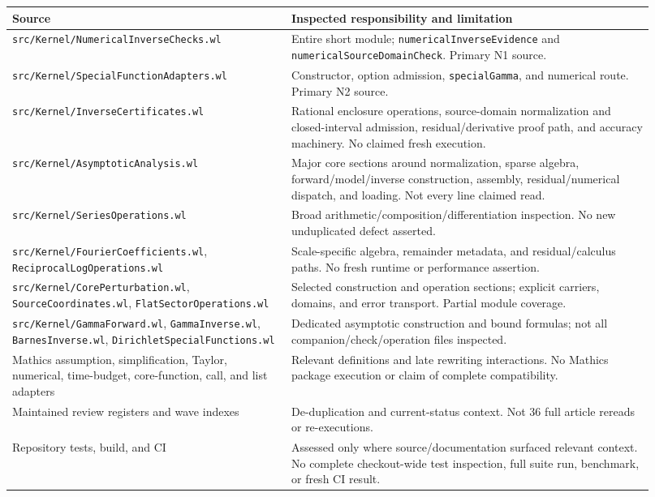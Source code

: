 \documentclass[11pt,letterpaper]{article}
\newcommand{\code}[1]{{\small\nolinkurl{#1}}}
\begin{document}
\begin{longtable}{@{}P{0.40\linewidth}P{0.52\linewidth}@{}}
\toprule
Source & Inspected responsibility and limitation\\\midrule\endhead
\code{src/Kernel/NumericalInverseChecks.wl} & Entire short module; \code{numericalInverseEvidence} and \code{numericalSourceDomainCheck}. Primary N1 source.\\[4pt]
\code{src/Kernel/SpecialFunctionAdapters.wl} & Constructor, option admission, \code{specialGamma}, and numerical route. Primary N2 source.\\[4pt]
\code{src/Kernel/InverseCertificates.wl} & Rational enclosure operations, source-domain normalization and closed-interval admission, residual/derivative proof path, and accuracy machinery. No claimed fresh execution.\\[4pt]
\code{src/Kernel/AsymptoticAnalysis.wl} & Major core sections around normalization, sparse algebra, forward/model/inverse construction, assembly, residual/numerical dispatch, and loading. Not every line claimed read.\\[4pt]
\code{src/Kernel/SeriesOperations.wl} & Broad arithmetic/composition/differentiation inspection. No new unduplicated defect asserted.\\[4pt]
\code{src/Kernel/FourierCoefficients.wl}, \code{ReciprocalLogOperations.wl} & Scale-specific algebra, remainder metadata, and residual/calculus paths. No fresh runtime or performance assertion.\\[4pt]
\code{src/Kernel/CorePerturbation.wl}, \code{SourceCoordinates.wl}, \code{FlatSectorOperations.wl} & Selected construction and operation sections; explicit carriers, domains, and error transport. Partial module coverage.\\[4pt]
\code{src/Kernel/GammaForward.wl}, \code{GammaInverse.wl}, \code{BarnesInverse.wl}, \code{DirichletSpecialFunctions.wl} & Dedicated asymptotic construction and bound formulas; not all companion/check/operation files inspected.\\[4pt]
Mathics assumption, simplification, Taylor, numerical, time-budget, core-function, call, and list adapters & Relevant definitions and late rewriting interactions. No Mathics package execution or claim of complete compatibility.\\[4pt]
Maintained review registers and wave indexes & De-duplication and current-status context. Not 36 full article rereads or re-executions.\\[4pt]
Repository tests, build, and CI & Assessed only where source/documentation surfaced relevant context. No complete checkout-wide test inspection, full suite run, benchmark, or fresh CI result.\\
\bottomrule
\end{longtable}
\end{document}
